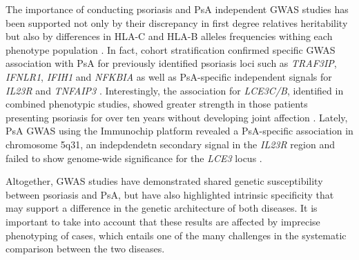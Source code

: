 The importance of conducting psoriasis and PsA independent GWAS studies has been supported not only by their discrepancy in first degree relatives heritability but also by differences in HLA-C and HLA-B alleles frequencies withing each phenotype population \parencite{Winchester2012, Okada2014}. In fact, cohort stratification confirmed specific GWAS association with PsA for previously identified psoriasis loci such as \textit{TRAF3IP}, \textit{IFNLR1}, \textit{IFIH1} and \textit{NFKBIA} as well as PsA-specific independent signals for \textit{IL23R} and \textit{TNFAIP3} \parencite{Ellinghaus2010, Stuart2015}.  Interestingly, the association for \textit{LCE3C/B}, identified in combined phenotypic studies, showed greater strength in those patients presenting psoriasis for over ten years without developing joint affection \parencite{Stuart2015}. Lately, PsA GWAS using the Immunochip platform revealed a PsA-specific association in chromosome 5q31, an indepdendetn secondary signal in the \textit{IL23R} region and failed to show genome-wide significance for the \textit{LCE3} locus \parencite{Bowes2015}. 

Altogether, GWAS studies have demonstrated shared genetic susceptibility between psoriasis and PsA, but have also highlighted intrinsic specificity that may support a difference in the genetic architecture of both diseases. It is important to take into account that these results are affected by imprecise phenotyping of cases, which entails one of the many challenges in the systematic comparison between the two diseases.


